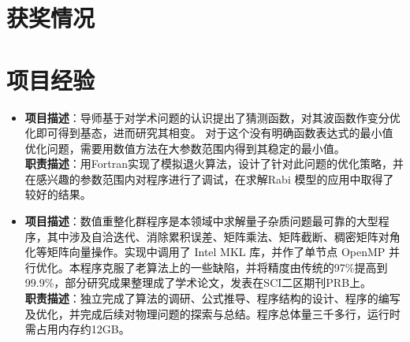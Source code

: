 \documentclass{resume}
\begin{document}
\section{获奖情况}

\section{项目经验}
\begin{itemize}%

\item {}
\textbf{项目描述}：导师基于对学术问题的认识提出了猜测函数，对其波函数作变分优化即可得到基态，进而研究其相变。 对于这个没有明确函数表达式的最小值优化问题，需要用数值方法在大参数范围内得到其稳定的最小值。\\
\textbf{职责描述}：用Fortran实现了模拟退火算法，设计了针对此问题的优化策略，并在感兴趣的参数范围内对程序进行了调试，在求解Rabi 模型的应用中取得了较好的结果。


\item {}
{\textbf{项目描述}：数值重整化群程序是本领域中求解量子杂质问题最可靠的大型程序，其中涉及自洽迭代、消除累积误差、矩阵乘法、矩阵截断、稠密矩阵对⻆化等矩阵向量操作。实现中调用了 Intel MKL 库，并作了单节点 OpenMP 并行优化。本程序克服了老算法上的一些缺陷，并将精度由传统的97\%提高到99.9\%，部分研究成果整理成了学术论文，发表在SCI二区期刊PRB上。}\\
\textbf{职责描述}：独立完成了算法的调研、公式推导、程序结构的设计、程序的编写及优化，并完成后续对物理问题的探索与总结。程序总体量三千多行，运行时需占用内存约12GB。


\end{itemize}
\end{document}
